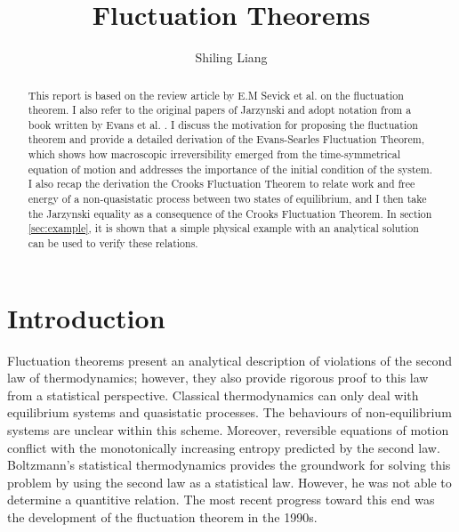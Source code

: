 \documentclass[ reprint, amsmath,amssymb, aps,]{revtex4-1}
\begin{document}
\title{Fluctuation Theorems}%



\author{Shiling Liang}
%


\begin{abstract}
This report is based on the review article
 by E.M Sevick et al.\cite{Sevick2007} on the fluctuation theorem. I also refer to the original papers of Jarzynski \cite{Jarzynski1997,Evans2002,Jarzynski2003} and adopt notation from a book written by Evans et al. \cite{evans2016fundamentals}. I discuss the motivation for proposing the fluctuation theorem and provide a detailed derivation of the Evans-Searles Fluctuation Theorem, which shows how macroscopic irreversibility emerged from the time-symmetrical equation of motion and addresses the importance of the initial condition of the system. I also recap the derivation the Crooks Fluctuation Theorem to relate work and free energy of a non-quasistatic process between two states of equilibrium, and I then take the Jarzynski equality as a consequence of the Crooks Fluctuation Theorem. In section \ref{sec:example}, it is shown that a simple physical example with an analytical solution can be used to verify these relations.

\end{abstract}

\maketitle



\section{Introduction}

 Fluctuation theorems present an analytical description of violations of the second law of thermodynamics; however, they also provide rigorous proof to this law from a statistical perspective. Classical thermodynamics can only deal with equilibrium systems and quasistatic processes. The behaviours of non-equilibrium systems are unclear within this scheme. Moreover, reversible equations of motion conflict with the monotonically increasing entropy predicted by the second law. Boltzmann's statistical thermodynamics provides the groundwork for solving this problem by using the second law as a statistical law. However, he was not able to determine a quantitive relation. The most recent progress toward this end was the development of the fluctuation theorem in the 1990s. 
 
\end{document}
